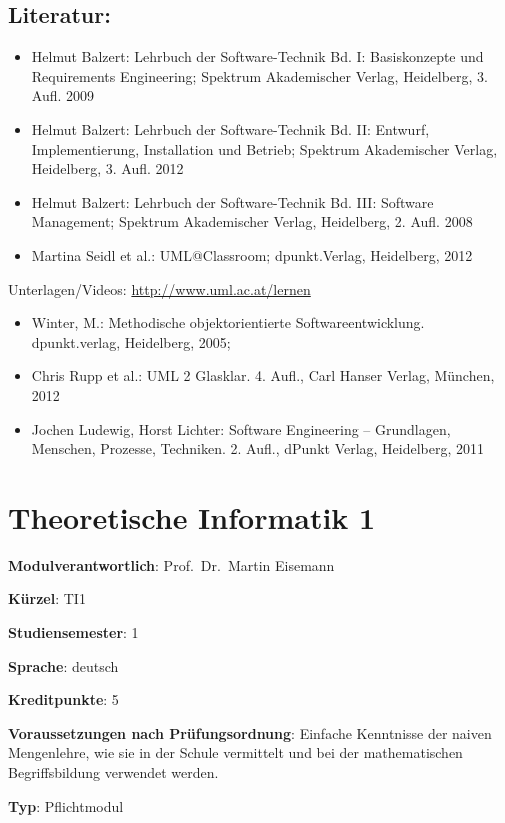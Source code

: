 \section*{Literatur:}\label{literatur-18}

\begin{itemize}
\tightlist
\item
  Helmut Balzert: Lehrbuch der Software-Technik Bd. I: Basiskonzepte und
  Requirements Engineering; Spektrum Akademischer Verlag, Heidelberg, 3.
  Aufl. 2009
\item
  Helmut Balzert: Lehrbuch der Software-Technik Bd. II: Entwurf,
  Implementierung, Installation und Betrieb; Spektrum Akademischer
  Verlag, Heidelberg, 3. Aufl. 2012
\item
  Helmut Balzert: Lehrbuch der Software-Technik Bd. III: Software
  Management; Spektrum Akademischer Verlag, Heidelberg, 2. Aufl. 2008
\item
  Martina Seidl et al.: UML@Classroom; dpunkt.Verlag, Heidelberg, 2012
\end{itemize}

Unterlagen/Videos: \url{http://www.uml.ac.at/lernen}

\begin{itemize}
\tightlist
\item
  Winter, M.: Methodische objektorientierte Softwareentwicklung.
  dpunkt.verlag, Heidelberg, 2005;
\item
  Chris Rupp et al.: UML 2 Glasklar. 4. Aufl., Carl Hanser Verlag,
  München, 2012
\item
  Jochen Ludewig, Horst Lichter: Software Engineering -- Grundlagen,
  Menschen, Prozesse, Techniken. 2. Aufl., dPunkt Verlag, Heidelberg,
  2011
\end{itemize}

\chapter{Theoretische Informatik 1}\label{theoretische-informatik-1}

\begin{modulHead}
\textbf{Modulverantwortlich}: Prof.~Dr.~Martin
Eisemann
\end{modulHead}
\begin{modulHead}
\textbf{Kürzel}:
TI1
\end{modulHead}
\begin{modulHead}
\textbf{Studiensemester}:
1
\end{modulHead}
\begin{modulHead}
\textbf{Sprache}:
deutsch
\end{modulHead}
\begin{modulHead}
\textbf{Kreditpunkte}:
5
\end{modulHead}
\begin{modulHead}
\textbf{Voraussetzungen nach
Prüfungsordnung}: Einfache Kenntnisse der naiven Mengenlehre, wie sie in
der Schule vermittelt und bei der mathematischen Begriffsbildung
verwendet werden.
\end{modulHead}
\begin{modulHead}
\textbf{Typ}:
Pflichtmodul
\end{modulHead}


